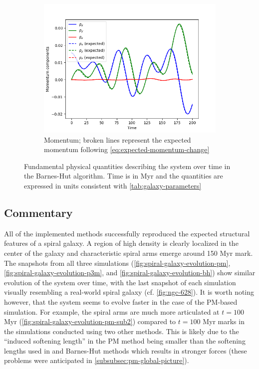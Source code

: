 \begin{figure}[htp]
    \vspace{0.5cm}

    \begin{subfigure}[b]{0.45\textwidth}
        \centering
        \includegraphics[width=\textwidth]{img/bh/momentum.png}
        \caption{Momentum; broken lines represent the expected momentum following \autoref{eq:expected-momentum-change}}
        \label{fig:physical-quantities-bh-sub3}
    \end{subfigure}

    \caption{Fundamental physical quantities describing the system over time in the Barnes-Hut algorithm.
        Time is in Myr and the quantities are expressed in units consistent with \autoref{tab:galaxy-parameters}}
    \label{fig:physical-quantities-bh}
\end{figure}

\subsection{Commentary}
All of the implemented methods successfully reproduced the expected structural features of a spiral galaxy.
A region of high density is clearly localized in the center of the galaxy and characteristic spiral arms emerge around 150 Myr mark.
The snapshots from all three simulations (\autoref{fig:spiral-galaxy-evolution-pm}, \autoref{fig:spiral-galaxy-evolution-p3m}, and \autoref{fig:spiral-galaxy-evolution-bh}) show similar evolution of the system over time, with the last snapshot of each simulation visually resembling a real-world spiral galaxy (cf. \autoref{fig:ngc-628}).
It is worth noting however, that the system seems to evolve faster in the case of the PM-based simulation.
For example, the spiral arms are much more articulated at $t=100$ Myr (\autoref{fig:spiral-galaxy-evolution-pm-sub2}) compared to $t=100$ Myr marks in the simulations conducted using two other methods.
This is likely due to the ``induced softening length'' in the PM method being smaller than the softening lengths used in \PThreeM{} and Barnes-Hut methods which results in stronger forces (these problems were anticipated in \autoref{subsubsec:pm-global-picture}).

